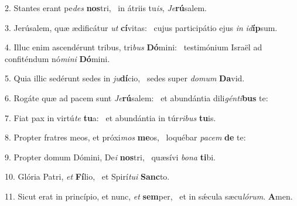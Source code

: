 2. Stantes erant pe\textit{des} \textbf{nos}tri, \ast\  in átriis tu\textit{is}, \textit{Je}\textbf{rú}salem.\

3. Jerúsalem, quæ ædificátur \textit{ut} \textbf{cí}vitas: \ast\  cujus participátio ejus \textit{in} \textit{id}\textbf{íp}sum.\

4. Illuc enim ascendérunt tribus, tri\textit{bus} \textbf{Dó}mini: \ast\  testimónium Israël ad confiténdum nó\textit{mi}\textit{ni} \textbf{Dó}mini.\

5. Quia illic sedérunt sedes in \textit{ju}\textbf{dí}cio, \ast\  sedes super \textit{do}\textit{mum} \textbf{Da}vid.\

6. Rogáte quæ ad pacem sunt \textit{Je}\textbf{rú}salem: \ast\  et abundántia dili\textit{gén}\textit{ti}\textbf{bus} te:\

7. Fiat pax in virtú\textit{te} \textbf{tu}a: \ast\  et abundántia in túr\textit{ri}\textit{bus} \textbf{tu}is.\

8. Propter fratres meos, et próxi\textit{mos} \textbf{me}os, \ast\  loquébar \textit{pa}\textit{cem} \textbf{de} te:\

9. Propter domum Dómini, De\textit{i} \textbf{nos}tri, \ast\  quæsívi \textit{bo}\textit{na} \textbf{ti}bi.\

10. Glória Patri, \textit{et} \textbf{Fí}lio, \ast\  et Spirí\textit{tu}\textit{i} \textbf{Sanc}to.\

11. Sicut erat in princípio, et nunc, \textit{et} \textbf{sem}per, \ast\  et in sǽcula sæcu\textit{ló}\textit{rum}. \textbf{A}men.\

